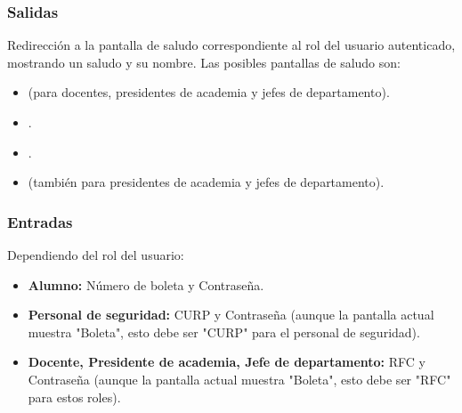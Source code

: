 \subsubsection{Salidas}
Redirección a la pantalla de saludo correspondiente al rol del usuario autenticado, mostrando un saludo y su nombre. Las posibles pantallas de saludo son:
\begin{itemize}
	\item {} (para docentes, presidentes de academia y jefes de departamento).
	\item {}.
	\item {}.
	\item {} (también para presidentes de academia y jefes de departamento).
\end{itemize}

\subsubsection{Entradas}
Dependiendo del rol del usuario:
\begin{itemize}
	\item \textbf{Alumno:} Número de boleta y Contraseña.
	\item \textbf{Personal de seguridad:} CURP y Contraseña (aunque la pantalla actual muestra "Boleta", esto debe ser "CURP" para el personal de seguridad).
	\item \textbf{Docente, Presidente de academia, Jefe de departamento:} RFC y Contraseña (aunque la pantalla actual muestra "Boleta", esto debe ser "RFC" para estos roles).
\end{itemize}
	
